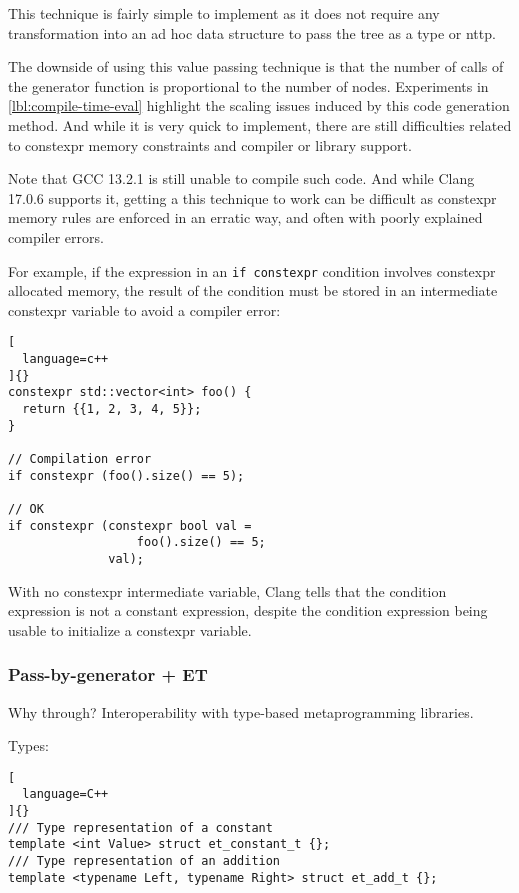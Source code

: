 \documentclass[../main]{subfiles}
\begin{document}
This technique is fairly simple to implement as it does not require any
transformation into an ad hoc data structure to pass the tree as a type
or \gls{nttp}.

The downside of using this value passing technique is that the
number of calls of the generator function is proportional to the
number of nodes. Experiments in \ref{lbl:compile-time-eval} highlight
the scaling issues induced by this code generation method.
And while it is very quick to implement, there are still difficulties
related to \gls{constexpr} memory constraints and compiler or library support.

Note that GCC 13.2.1 is still unable to compile such code.
And while Clang 17.0.6 supports it, getting a this technique to work can be
difficult as \gls{constexpr} memory rules are enforced in an erratic way,
and often with poorly explained compiler errors.

For example, if the expression in an \lstinline{if constexpr}
condition involves \gls{constexpr} allocated memory, the result of the condition
must be stored in an intermediate \gls{constexpr} variable to avoid a compiler
error:

\begin{lstlisting}[
  language=c++
]{}
constexpr std::vector<int> foo() {
  return {{1, 2, 3, 4, 5}};
}

// Compilation error
if constexpr (foo().size() == 5);

// OK
if constexpr (constexpr bool val =
                  foo().size() == 5;
              val);
\end{lstlisting}

With no \gls{constexpr} intermediate variable, Clang tells that the condition
expression is not a constant expression, despite the condition expression being
usable to initialize a \gls{constexpr} variable.

\subsubsection{
  Pass-by-generator + ET
}

\label{lbl:pbg-et-technique}

Why through? Interoperability with type-based metaprogramming libraries.

Types:

\begin{lstlisting}[
  language=C++
]{}
/// Type representation of a constant
template <int Value> struct et_constant_t {};
/// Type representation of an addition
template <typename Left, typename Right> struct et_add_t {};
\end{lstlisting}
\end{document}
